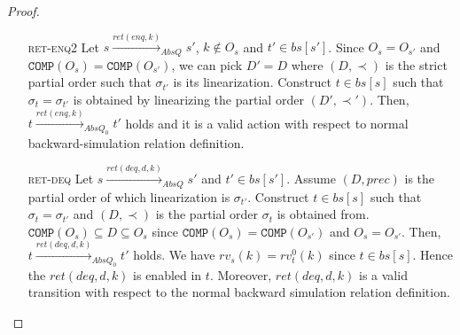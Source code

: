 \begin{proof}
\begin{itemize}
\item[\textsc{ret-enq2}]  Let $s \xrightarrow{ret(enq,k)}_{AbsQ} s'$, $k \notin O_s$ and $t' \in bs[s']$. Since $O_s = O_{s'}$ and $\texttt{COMP}(O_s) = \texttt{COMP}(O_{s'})$, we can pick $D' = D$ where $(D, \prec)$ is the strict partial order such that $\sigma_{t'}$ is its linearization. Construct $t \in bs[s]$ such that $\sigma_t = \sigma_{t'}$ is obtained by linearizing the partial order $(D',\prec')$. Then, $t \xrightarrow{ret(enq,k)}_{AbsQ_0} t'$ holds and it is a valid action with respect to normal backward-simulation relation definition. 

\item[\textsc{ret-deq}]  Let $s \xrightarrow{ret(deq,d,k)}_{AbsQ} s'$ and $t' \in bs[s']$. Assume $(D, prec)$ is the partial order of which linearization is $\sigma_{t'}$. Construct $t \in bs[s]$ such that $\sigma_t = \sigma_{t'}$ and $(D, \prec
)$ is the partial order $\sigma_t$ is obtained from. $\texttt{COMP}(O_s) \subseteq D \subseteq O_s$ since $\texttt{COMP}(O_s) = \texttt{COMP}(O_{s'})$ and $O_s = O_{s'}$. Then, $t \xrightarrow{ret(deq,d,k)}_{AbsQ_0} t'$ holds. We have $rv_s(k) = rv^0_t(k)$ since $t \in bs[s]$. Hence the $ret(deq,d,k)$ is enabled in $t$. Moreover, $ret(deq,d,k)$ is a valid transition with respect to the normal backward simulation relation definition.
\end{itemize}
\end{proof}

